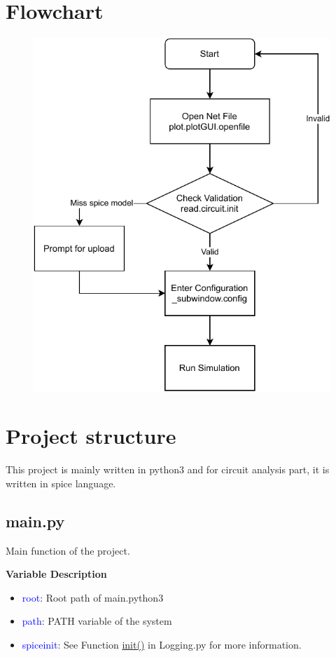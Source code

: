 \documentclass[12pt,a4paper]{article}
\begin{document}
\section{Flowchart}
\begin{figure}[ht]
    \centering
    \includegraphics{Image/spice.pdf}
    \caption{}
\end{figure}

\section{Project structure}
This project is mainly written in python3 and for circuit analysis part, it is written in spice language.

\subsection{main.py}
Main function of the project.

\noindent\textbf{Variable Description}
\begin{itemize}
    \item \textcolor{blue}{root}: Root path of main.python3
    \item \textcolor{blue}{path}: PATH variable of the system
    \item \textcolor{blue}{spiceinit}: See Function \hyperlink{init}{init()} in Logging.py for more information.
\end{itemize}
\end{document}
